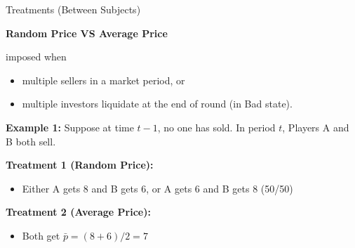 \documentclass{beamer}
\begin{document}
\begin{frame}{Treatments (Between Subjects)}

\textbf{Random Price VS Average Price}

imposed when 
\begin{itemize}
    \item multiple sellers in a market period, or 
    \item multiple investors liquidate at the end of round (in Bad state).
\end{itemize}

\vspace{0.2in}

\textbf{Example 1:} Suppose at time $t-1$, no one has sold. In period $t$, Players A and B both sell.

\vspace{0.1in}

\textbf{Treatment 1 (Random Price):}
\begin{itemize}
    \item Either A gets $8$ and B gets $6$, or A gets $6$ and B gets  $8$ (50/50)
\end{itemize}

\vspace{0.1in}

\textbf{Treatment 2 (Average Price):}
\begin{itemize}
    \item Both get $\bar{p} = (8+6)/2 = 7$
\end{itemize}

\end{frame}
\end{document}
